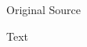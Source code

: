 				\begin{description}
					\item[Original Source]
				\end{description}
				
				
				\begin{description}
					\item[Text]
				\end{description}
				
